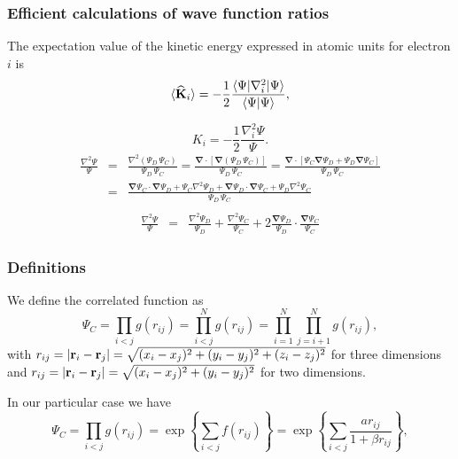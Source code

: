 \documentclass[compress]{beamer}
\newcommand{\Grad}[1]{\boldsymbol{\nabla}{#1}}
\newcommand{\Op}[1]{{\bf\widehat{#1}}}                    %
\begin{document}
\frame
 {
   \frametitle{Efficient calculations of wave function ratios}
 \begin{small}
 {\scriptsize

The expectation value of the kinetic energy expressed in atomic units for electron $i$ is 
\begin{equation}
 \langle \Op{K}_i \rangle = -\frac{1}{2}\frac{\langle\Psi|\nabla_{i}^2|\Psi \rangle}{\langle\Psi|\Psi \rangle},
\end{equation}

\begin{equation}\label{kineticE}
K_i = -\frac{1}{2}\frac{\nabla_{i}^{2} \Psi}{\Psi}.
\end{equation}
\begin{eqnarray}
\frac{\nabla^2 \Psi}{\Psi} & = & \frac{\nabla^2 ({\Psi_{D} \,  \Psi_C})}{\Psi_{D} \,  \Psi_C} = \frac{\Grad \cdot [\Grad {(\Psi_{D} \,  \Psi_C)}]}{\Psi_{D} \,  \Psi_C} = \frac{\Grad \cdot [ \Psi_C \Grad \Psi_{D} + \Psi_{D} \Grad  \Psi_C]}{\Psi_{D} \,  \Psi_C}\nonumber\\
&  = & \frac{\Grad  \Psi_C \cdot \Grad \Psi_{D} +  \Psi_C \nabla^2 \Psi_{D} + \Grad \Psi_{D} \cdot \Grad  \Psi_C + \Psi_{D} \nabla^2  \Psi_C}{\Psi_{D} \,  \Psi_C}\nonumber\\
\end{eqnarray}
\begin{eqnarray}
\frac{\nabla^2 \Psi}{\Psi}
& = & \frac{\nabla^2 \Psi_{D}}{\Psi_{D}} + \frac{\nabla^2  \Psi_C}{ \Psi_C} + 2 \frac{\Grad \Psi_{D}}{\Psi_{D}}\cdot\frac{\Grad  \Psi_C}{ \Psi_C}
\end{eqnarray}
 }
 \end{small}
 }


\frame
 {
   \frametitle{Definitions}
 \begin{small}
 {\scriptsize
We define the correlated function as
\[
\Psi_C=\prod_{i< j}g(r_{ij})=\prod_{i< j}^Ng(r_{ij})= \prod_{i=1}^N\prod_{j=i+1}^Ng(r_{ij}),
\]
with 
$r_{ij}=|{\bf r}_i-{\bf r}_j|=\sqrt{(x_i-x_j)^2+(y_i-y_j)^2+(z_i-z_j)^2}$ for three dimensions and
$r_{ij}=|{\bf r}_i-{\bf r}_j|=\sqrt{(x_i-x_j)^2+(y_i-y_j)^2}$ for two dimensions.

In our particular case we have
\[
\Psi_C=\prod_{i< j}g(r_{ij})=\exp{\left\{\sum_{i<j}f(r_{ij})\right\}}=
\exp{\left\{\sum_{i<j}\frac{ar_{ij}}{1+\beta r_{ij}}\right\}},
\]
 }
 \end{small}
 }
\end{document}
